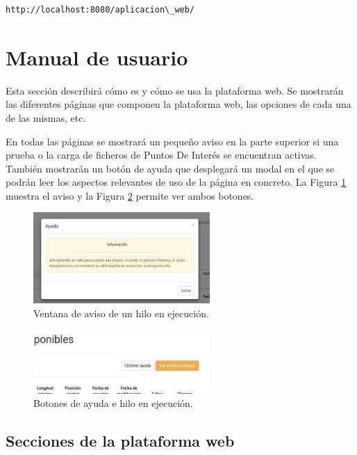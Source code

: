 \begin{lstlisting}[language=bash]
  http://localhost:8080/aplicacion\_web/
\end{lstlisting}

\section{Manual de usuario}
Esta sección describirá cómo es y cómo se usa la plataforma web. Se mostrarán las diferentes páginas que componen la plataforma web, las opciones de cada una de las mismas, etc.

En todas las páginas se mostrará un pequeño aviso en la parte superior si una prueba o la carga de ficheros de Puntos De Interés se encuentran activas. También mostrarán un botón de ayuda que desplegará un modal en el que se podrán leer los aspectos relevantes de uso de la página en concreto. La Figura \ref{ejealgo} muestra el aviso y la Figura \ref{botones} permite ver ambos botones.

\begin{figure}[h]
  \centering
    \includegraphics[width=0.6\textwidth]{../img/manualusuario/ejealgo.jpg}
  \caption{Ventana de aviso de un hilo en ejecución.}
  \label{ejealgo}
\end{figure}

\begin{figure}[h]
  \centering
    \includegraphics[width=0.6\textwidth]{../img/manualusuario/botones.jpg}
  \caption{Botones de ayuda e hilo en ejecución.}
  \label{botones}
\end{figure}

\subsection{Secciones de la plataforma web}

